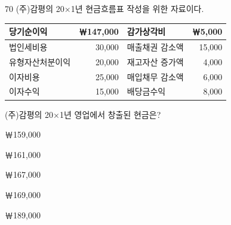 \begin{question}{70}
(주)감평의 20×1년 현금흐름표 작성을 위한 자료이다.
\par{\small\centering\begin{tabular}{|l|r|l|r|}\hline
당기순이익 & ￦147,000 & 감가상각비 & ￦5,000 \\ \hline
법인세비용 & 30,000 & 매출채권 감소액 & 15,000 \\ \hline
유형자산처분이익 & 20,000 & 재고자산 증가액 & 4,000 \\ \hline
이자비용 & 25,000 & 매입채무 감소액 & 6,000 \\ \hline
이자수익 & 15,000 & 배당금수익 & 8,000 \\ \hline
\end{tabular}\par}
(주)감평의 20×1년 영업에서 창출된 현금은?
\begin{choices}
  \item ￦159,000
  \item ￦161,000
  \item ￦167,000
  \item ￦169,000
  \item ￦189,000
\end{choices}
\end{question}
